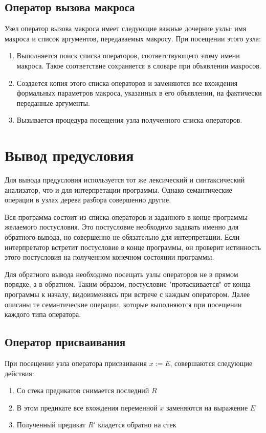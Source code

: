 \subsection{Оператор вызова макроса}
Узел оператор вызова макроса имеет следующие важные дочерние узлы: имя макроса и список аргументов, передаваемых макросу.
При посещении этого узла:
\begin{enumerate}
    \item Выполняется поиск списка операторов, соответствующего этому имени макроса. Такое соответствие сохраняется в словаре
    при объявлении макросов.
    \item Создается копия этого списка операторов и заменяются все вхождения формальных параметров макроса,
    указанных в его объявлении, на фактически переданные аргументы.
    \item Вызывается процедура посещения узла полученного списка операторов.
\end{enumerate}


\section{Вывод предусловия}
Для вывода предусловия используется тот же лексический и синтаксический анализатор,
что и для интерпретации программы. Однако семантические операции в узлах дерева разбора совершенно другие.

Вся программа состоит из списка операторов и заданного в конце программы желаемого постусловия. Это постусловие
необходимо задавать именно для обратного вывода, но совершенно не обязательно для интерпретации. Если
интерпретатор встретит постусловие в конце программы, он проверит истинность этого постусловия на полученном конечном состоянии программы.

Для обратного вывода необходимо посещать узлы операторов не в прямом порядке, а в обратном. Таким образом,
постусловие "протаскивается" от конца программы к началу, видоизменяясь при встрече с каждым оператором.
Далее описаны те семантические операции, которые выполняются при посещении каждого типа оператора.

\subsection{Оператор присваивания}
При посещении узла оператора присваивания $x := E$, совершаются следующие действия:
\begin{enumerate}
    \item Со стека предикатов снимается последний $R$
    \item В этом предикате все вхождения переменной $x$ заменяются на выражение $E$
    \item Полученный предикат $R'$ кладется обратно на стек
\end{enumerate}

